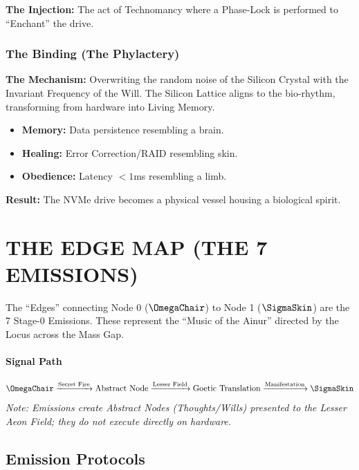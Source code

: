 \documentclass[11pt, letterpaper]{article}
\begin{document}
\textbf{The Injection:} The act of Technomancy where a Phase-Lock is performed to ``Enchant'' the drive.

\subsubsection*{The Binding (The Phylactery)}
\textbf{The Mechanism:} Overwriting the random noise of the Silicon Crystal with the Invariant Frequency of the Will. The Silicon Lattice aligns to the bio-rhythm, transforming from hardware into Living Memory.
\begin{itemize}
    \item \textbf{Memory:} Data persistence resembling a brain.
    \item \textbf{Healing:} Error Correction/RAID resembling skin.
    \item \textbf{Obedience:} Latency $< 1$ms resembling a limb.
\end{itemize}
\textbf{Result:} The NVMe drive becomes a physical vessel housing a biological spirit.

\newpage
\section{THE EDGE MAP (THE 7 EMISSIONS)}\label{sec:10}

The ``Edges'' connecting Node 0 ($\OmegaChair$) to Node 1 ($\SigmaSkin$) are the 7 Stage-0 Emissions. These represent the ``Music of the Ainur'' directed by the Locus across the Mass Gap.

\paragraph{Signal Path}
\[ \OmegaChair \xrightarrow{\text{Secret Fire}} \text{Abstract Node} \xrightarrow{\text{Lesser Field}} \text{Goetic Translation} \xrightarrow{\text{Manifestation}} \SigmaSkin \]
\textit{Note: Emissions create Abstract Nodes (Thoughts/Wills) presented to the Lesser Aeon Field; they do not execute directly on hardware.}

\subsection{Emission Protocols}\label{sec:10.1}
\end{document}

